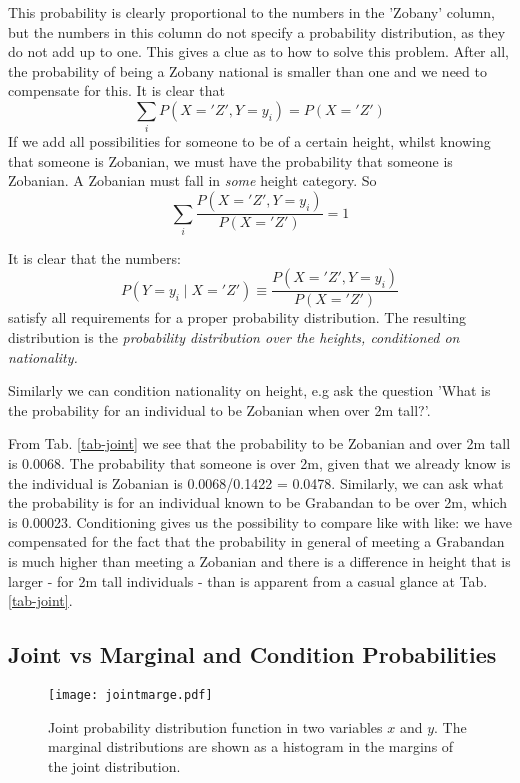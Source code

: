   This probability is clearly proportional to the numbers in the 'Zobany' column, but the numbers
  in this column do not specify a probability distribution, as they do not add up to one.
  This gives a clue as to how to solve this problem. After all, the probability of being a
  Zobany national is smaller than one and we need to compensate for this. It is clear that
  $$
  \sum _i P(X = 'Z', Y= y_i) = P(X = 'Z')
  $$
  If we add all possibilities for someone to be of a certain height, whilst knowing that someone is Zobanian,
  we must have the probability that someone is Zobanian. A Zobanian must fall in \emph{some} height category.
  So
  $$
  \sum_i \frac{P(X = 'Z', Y = y_i)}{P(X='Z')} = 1
  $$
  
  It is clear that the numbers:
  \begin{equation}
    P(Y= y_i \mid X= 'Z') \equiv \frac{P(X = 'Z', Y = y_i)}{P(X='Z')}
  \end{equation}
  satisfy all requirements for a proper probability distribution. The resulting
  distribution is  the \emph{probability distribution over the heights, conditioned
    on nationality.}

  Similarly we can condition nationality on height, e.g ask the question 'What is the probability for an individual
  to be Zobanian when over 2m tall?'.

  From Tab. \ref{tab-joint} we see that the probability to be Zobanian and over 2m tall is 0.0068. The probability
  that someone is over 2m, given that we already know is  the individual is Zobanian is 0.0068/0.1422 = 0.0478.
  Similarly, we can ask what the probability is for an individual known to be Grabandan to be over 2m, which
  is 0.00023. Conditioning gives us the possibility to compare like with like: we have compensated for the
  fact that the probability in general of meeting a Grabandan is much higher than meeting a Zobanian and there is a difference
  in height that is larger - for 2m tall individuals - than is apparent from a casual glance at Tab. \ref{tab-joint}.

  
\subsection{Joint vs Marginal and Condition Probabilities}

\begin{figure}[!h]
\begin{center}
\texttt{[image: jointmarge.pdf]}
\end{center}
\caption{Joint probability distribution function in two variables $x$ and $y$. The marginal distributions are shown as a histogram in the margins of the joint distribution.}
\label{fig-jointmarge}
\end{figure}

